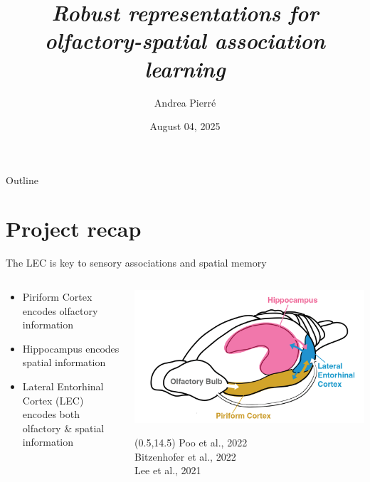 \documentclass[bigger]{beamer}
\author{Andrea Pierré}
\date{August 04, 2025}
\title{\emph{Robust representations for olfactory-spatial association learning}}
\begin{document}
\maketitle
\begin{frame}[plain]{Outline}
\tableofcontents
\end{frame}

\section{Project recap}
\label{sec:orgae57615}
\begin{frame}[label={sec:org11e8010}]{The LEC is key to sensory associations and spatial memory}
\begin{columns}
\begin{column}{0.45\columnwidth}
\footnotesize
\begin{itemize}
\item \alert{Piriform Cortex} encodes olfactory information
\item \alert{Hippocampus} encodes spatial information
\item \alert{Lateral Entorhinal Cortex (LEC)} encodes both olfactory \& spatial information
\end{itemize}
\end{column}
\begin{column}{0.55\columnwidth}
\begin{center}
\includegraphics[width=\textwidth]{medias/brain.png}
\end{center}

\begin{textblock}{5}(0.5,14.5)%
\tiny
Poo et al., 2022\\
Bitzenhofer et al., 2022\\
Lee et al., 2021
\end{textblock}
\end{column}
\end{columns}
\end{frame}
\end{document}
